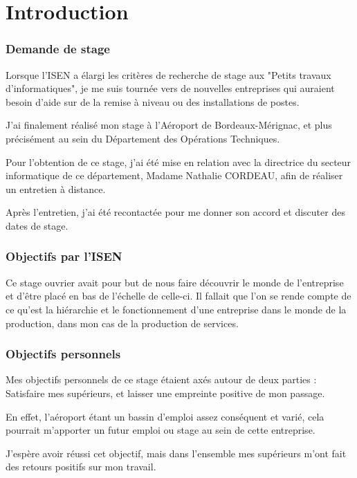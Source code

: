 \section*{Introduction}

\subsubsection{Demande de stage}

Lorsque l'ISEN a élargi les critères de recherche de stage aux "Petits travaux d'informatiques", je me suis tournée vers de nouvelles entreprises qui auraient besoin d'aide sur de la remise à niveau ou des installations de postes.

J'ai finalement réalisé mon stage à l'Aéroport de Bordeaux-Mérignac, et plus précisément au sein du Département des Opérations Techniques.

Pour l'obtention de ce stage, j'ai été mise en relation avec la directrice du secteur informatique de ce département, Madame Nathalie CORDEAU, afin de réaliser un entretien à distance. 

Après l'entretien, j'ai été recontactée pour me donner son accord et discuter des dates de stage.

\subsubsection{Objectifs par l'ISEN}

Ce stage ouvrier avait pour but de nous faire découvrir le monde de l'entreprise et d'être placé en bas de l'échelle de celle-ci. Il fallait que l'on se rende compte de ce qu'est la hiérarchie et le fonctionnement d'une entreprise dans le monde de la production, dans mon cas de la production de services.

\subsubsection{Objectifs personnels}

Mes objectifs personnels de ce stage étaient axés autour de deux parties : Satisfaire mes supérieurs, et laisser une empreinte positive de mon passage.

En effet, l'aéroport étant un bassin d'emploi assez conséquent et varié, cela pourrait m'apporter un futur emploi ou stage au sein de cette entreprise.

J'espère avoir réussi cet objectif, mais dans l'ensemble mes supérieurs m'ont fait des retours positifs sur mon travail.